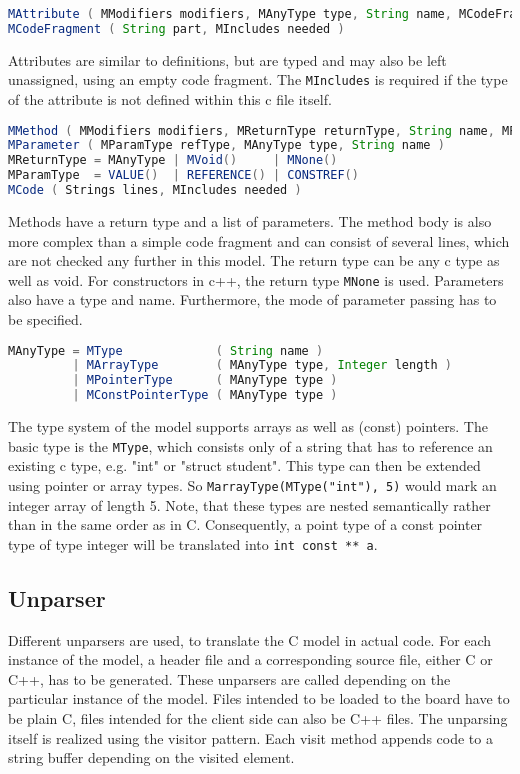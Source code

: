 \documentclass{report}
\begin{document}
\begin{lstlisting}[language=java, breaklines=true]
MAttribute ( MModifiers modifiers, MAnyType type, String name, MCodeFragment initial )
MCodeFragment ( String part, MIncludes needed )
\end{lstlisting}

Attributes are similar to definitions, but are typed and may also be left unassigned, using an empty code fragment. The \texttt{MIncludes} is required if the type of the attribute is not defined within this c file itself.

\begin{lstlisting}[language=java, breaklines=true]
MMethod ( MModifiers modifiers, MReturnType returnType, String name, MParameters parameter, MCode body )
MParameter ( MParamType refType, MAnyType type, String name )
MReturnType = MAnyType | MVoid()     | MNone()
MParamType  = VALUE()  | REFERENCE() | CONSTREF()
MCode ( Strings lines, MIncludes needed )
\end{lstlisting}

Methods have a return type and a list of parameters. The method body is also more complex than a simple code fragment and can consist of several lines, which are not checked any further in this model. The return type can be any c type as well as void. For constructors in c++, the return type \texttt{MNone} is used. Parameters also have a type and name. Furthermore, the mode of parameter passing has to be specified.

\begin{lstlisting}[language=java, breaklines=true]
MAnyType = MType             ( String name )
         | MArrayType        ( MAnyType type, Integer length )
         | MPointerType      ( MAnyType type )
         | MConstPointerType ( MAnyType type )
\end{lstlisting}

The type system of the model supports arrays as well as (const) pointers. The basic type is the \texttt{MType}, which consists only of a string that has to reference an existing c type, e.g. "int" or "struct student". This type can then be extended using pointer or array types. So \texttt{MarrayType(MType("int"), 5)} would mark an integer array of length 5. Note, that these types are nested semantically rather than in the same order as in C. Consequently, a point type of a const pointer type of type integer will be translated into \texttt{int const ** a}.

\subsection{Unparser}
Different unparsers are used, to translate the C model in actual code. For each instance of the model, a header file and a corresponding source file, either C or C++, has to be generated. These unparsers are called depending on the particular instance of the model. Files intended to be loaded to the board have to be plain C, files intended for the client side can also be C++ files. The unparsing itself is realized using the visitor pattern. Each visit method appends code to a string buffer depending on the visited element.
\end{document}

